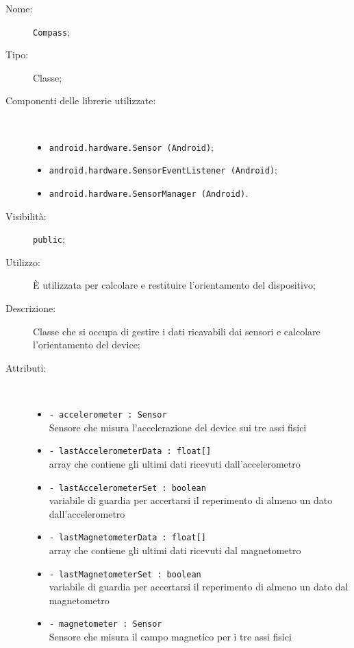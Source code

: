 \documentclass[../DefinizioneDiProdotto.tex]{subfiles}
\begin{document}
\begin{description}
	\item[Nome:] \texttt{Compass};
	\item[Tipo:] Classe;
	\item[Componenti delle librerie utilizzate:] \
	\begin{itemize}
		\item \texttt{android.hardware.Sensor (Android)};
		
		\item \texttt{android.hardware.SensorEventListener (Android)};
		
		\item \texttt{android.hardware.SensorManager (Android)}.
		
	\end{itemize}
	\item[Visibilità:] \texttt{public};
	\item[Utilizzo:] È utilizzata per calcolare e restituire l'orientamento del dispositivo;
	\item[Descrizione:] Classe che si occupa di gestire i dati ricavabili dai sensori e calcolare l'orientamento del device;
	\item[Attributi:] \
	\begin{itemize}
		\item \texttt{- accelerometer : Sensor}\\
		Sensore che misura l'accelerazione del device sui tre assi fisici
		
		\item \texttt{- lastAccelerometerData : float[]}\\
		array che contiene gli ultimi dati ricevuti dall'accelerometro
		
		\item \texttt{- lastAccelerometerSet : boolean}\\
		variabile di guardia per accertarsi il reperimento di almeno un dato dall'accelerometro
		
		\item \texttt{- lastMagnetometerData : float[]}\\
		array che contiene gli ultimi dati ricevuti dal magnetometro
		
		\item \texttt{- lastMagnetometerSet : boolean}\\
		variabile di guardia per accertarsi il reperimento di almeno un dato dal magnetometro
		
		\item \texttt{- magnetometer : Sensor}\\
		Sensore che misura il campo magnetico per i tre assi fisici
		

\end{itemize}
\end{description}
\end{document}
